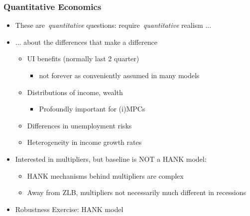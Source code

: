 \documentclass[pdflatex,aspectratio=169]{beamer}
\begin{document}
\begin{frame}
  \frametitle{Quantitative Economics}
  \begin{itemize}[<+->]
    \itemsep = .75\bigskipamount
    \item
          These are~\textit{quantitative} questions: require~\textit{quantitative} realism ...
    \item
          ... about the differences that make a difference
          \begin{itemize}[<+->]
            \itemsep = .25\bigskipamount
            \item
                  UI benefits (normally last 2 quarter)
                  \begin{itemize}
                    \item
                          not forever as conveniently assumed in many models
                  \end{itemize}
            \item
                  Distributions of income, wealth
                  \begin{itemize}
                    \item
                          Profoundly important for (i)MPCs
                  \end{itemize}
            \item
                  Differences in unemployment risks
            \item
                  Heterogeneity in income growth rates
          \end{itemize}
  \end{itemize}


  \begin{itemize}[<+->]
    \item
          Interested in multipliers, but baseline is NOT a HANK model:
          \begin{itemize}[<+->]
            \itemsep = .25\bigskipamount
            \item
                  HANK mechanisms behind multipliers are complex
            \item
                  Away from ZLB, multipliers not necessarily much different in recessions
          \end{itemize}
  \end{itemize}

  \begin{itemize}[<+->]
    \itemsep = .25\bigskipamount
    \item
          Robustness Exercise: HANK model
  \end{itemize}
\end{frame}
\end{document}
